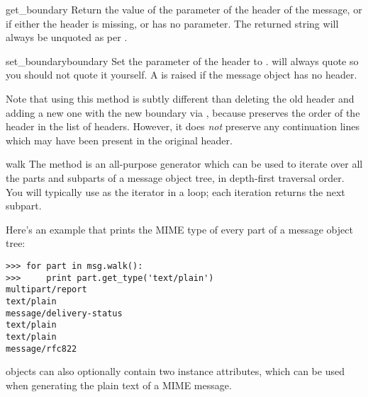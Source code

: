 \begin{methoddesc}[Message]{get_boundary}{}
Return the value of the  parameter of the
 header of the message, or  if either
the header is missing, or has no  parameter.  The
returned string will always be unquoted as per
.
\end{methoddesc}

\begin{methoddesc}[Message]{set_boundary}{boundary}
Set the  parameter of the  header
to .   will always quote
 so you should not quote it yourself.  A
 is raised if the message object has no
 header.

Note that using this method is subtly different than deleting the old
 header and adding a new one with the new boundary
via , because  preserves the
order of the  header in the list of headers.
However, it does \emph{not} preserve any continuation lines which may
have been present in the original  header.
\end{methoddesc}

\begin{methoddesc}[Message]{walk}{}
The  method is an all-purpose generator which can be
used to iterate over all the parts and subparts of a message object
tree, in depth-first traversal order.  You will typically use
 as the iterator in a  loop; each
iteration returns the next subpart.

Here's an example that prints the MIME type of every part of a message
object tree:

\begin{verbatim}
>>> for part in msg.walk():
>>>     print part.get_type('text/plain')
multipart/report
text/plain
message/delivery-status
text/plain
text/plain
message/rfc822
\end{verbatim}
\end{methoddesc}

 objects can also optionally contain two instance
attributes, which can be used when generating the plain text of a MIME
message.

